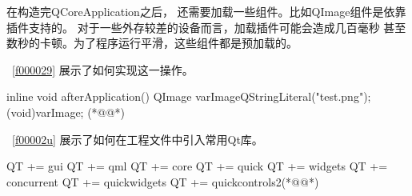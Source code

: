 在构造完QCoreApplication之后，
还需要加载一些组件。比如QImage组件是依靠插件支持的。
对于一些外存较差的设备而言，加载插件可能会造成几百毫秒
甚至数秒的卡顿。为了程序运行平滑，这些组件都是预加载的。

\filesourcenumbernameone\ \ref{f000029}
展示了如何实现这一操作。

\label{f000029}    %
\FloatBarrier                                  %
\begin{thebookfilesourceone}[escapeinside={(*@}{@*)},
caption=GoodLuck,
title=\filesourcenumbernameone \thefilesourcenumber
,firstnumber=54]
inline void afterApplication() {
    {
        QImage varImage{QStringLiteral("test.png")};
        (void)varImage;
    }
}(*@\marginpar[\hfill\setlength\fboxsep{2pt}\fbox{\footnotesize{\kaishu\parbox{1em}{\setlength{\baselineskip}{2pt}\filesourcenumbernameone}}\footnotesize{\thefilesourcenumber}}]{\setlength\fboxsep{2pt}\fbox{\footnotesize{\kaishu\parbox{1em}{\setlength{\baselineskip}{2pt}\filesourcenumbernameone}}\footnotesize{\thefilesourcenumber}}}@*)\end{thebookfilesourceone}          %
\addtocounter{lstlisting}{-1}   %

\filesourcenumbernameone\ \ref{f00002u}
展示了如何在工程文件中引入常用Qt库。

\label{f00002u}    %
\FloatBarrier                                  %
\begin{thebookfilesourceone}[escapeinside={(*@}{@*)},
caption=GoodLuck,
title=\filesourcenumbernameone \thefilesourcenumber
]
QT += gui
QT += qml
QT += core
QT += quick
QT += widgets
QT += concurrent
QT += quickwidgets
QT += quickcontrols2(*@\marginpar[\hfill\setlength\fboxsep{2pt}\fbox{\footnotesize{\kaishu\parbox{1em}{\setlength{\baselineskip}{2pt}\filesourcenumbernameone}}\footnotesize{\thefilesourcenumber}}]{\setlength\fboxsep{2pt}\fbox{\footnotesize{\kaishu\parbox{1em}{\setlength{\baselineskip}{2pt}\filesourcenumbernameone}}\footnotesize{\thefilesourcenumber}}}@*)\end{thebookfilesourceone}          %
\addtocounter{lstlisting}{-1}   %

